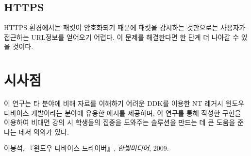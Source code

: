 \documentclass{tudelftposter}
\begin{document}
\subsection{HTTPS}
HTTPS 환경에서는 패킷이 암호화되기 때문에 패킷을 감시하는 것만으로는 사용자가 접근하는 URL정보를 얻어오기 어렵다. 이 문제를 해결한다면 한 단계 더 나아갈 수 있을 것이다.

\section{시사점}
이 연구는 타 분야에 비해 자료를 이해하기 어려운 DDK를 이용한 NT 레거시 윈도우 디바이스 개발이라는 분야에 유용한 예시를 제공하며, 이 연구를 통해 작성한 구현을 이용하여 비대면 강의 시 학생들의 집중을 도와주는 솔루션을 만드는 데 큰 도움을 준다는 데서 의의가 있다.

\begin{thebibliography}{1}
    이봉석, 『윈도우 디바이스 드라이버』, {\em 한빛미디어}, 2009.
\end{thebibliography}
\end{document}
